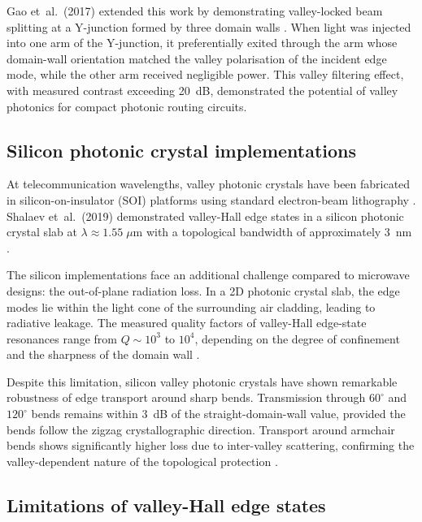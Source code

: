 Gao et~al.\ (2017) extended this work by demonstrating valley-locked
beam splitting at a Y-junction formed by three domain walls
\cite{gao2017valley}.  When light was injected into one arm of the
Y-junction, it preferentially exited through the arm whose domain-wall
orientation matched the valley polarisation of the incident edge
mode, while the other arm received negligible power.  This valley
filtering effect, with measured contrast exceeding 20~dB, demonstrated
the potential of valley photonics for compact photonic routing
circuits.

\subsection{Silicon photonic crystal implementations}
\label{sec:ch12-silicon-valley}

At telecommunication wavelengths, valley photonic crystals have been
fabricated in silicon-on-insulator (SOI) platforms using standard
electron-beam lithography \cite{he2019silicon}.  Shalaev et~al.\ (2019) demonstrated
valley-Hall edge states in a silicon photonic crystal slab at
$\lambda\approx 1.55\;\mu\mathrm{m}$ with a topological bandwidth of
approximately 3~nm \cite{ozawa2018topological}.

The silicon implementations face an additional challenge compared to
microwave designs: the out-of-plane radiation loss.  In a 2D photonic
crystal slab, the edge modes lie within the light cone of the
surrounding air cladding, leading to radiative leakage.  The measured
quality factors of valley-Hall edge-state resonances range from
$Q\sim 10^3$ to $10^4$, depending on the degree of confinement
and the sharpness of the domain wall
\cite{ozawa2018topological,price2022roadmap}.

Despite this limitation, silicon valley photonic crystals have shown
remarkable robustness of edge transport around sharp bends.
Transmission through $60^\circ$ and $120^\circ$ bends remains within
3~dB of the straight-domain-wall value, provided the bends follow
the zigzag crystallographic direction.  Transport around armchair
bends shows significantly higher loss due to inter-valley scattering,
confirming the valley-dependent nature of the topological protection
\cite{ozawa2018topological}.

\subsection{Limitations of valley-Hall edge states}
\label{sec:ch12-valley-limitations}

